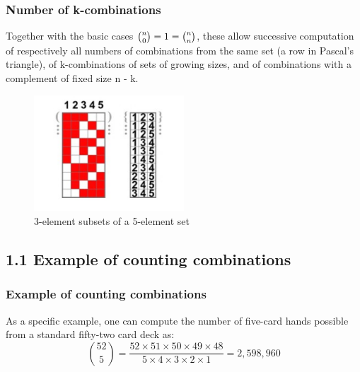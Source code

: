\documentclass{beamer}
\begin{document}
\begin{frame}
\frametitle{Number of k-combinations}
Together with the basic cases ${\tbinom {n}{0}}=1={\tbinom {n}{n}}$, these allow successive computation of respectively all numbers of combinations from the same set (a row in Pascal's triangle), of k-combinations of sets of growing sizes, and of combinations with a complement of fixed size n - k.\\
\begin{figure}[h]
\caption{3-element subsets of a 5-element set}
\centering
\includegraphics[width=0.5\textwidth]{1.pdf}
\end{figure}
\end{frame}

\subsection{1.1 Example of counting combinations}
\begin{frame}
\frametitle{Example of counting combinations}
As a specific example, one can compute the number of five-card hands possible from a standard fifty-two card deck as:
$${\binom {52}{5}}=\frac {52\times 51 \times 50 \times 49 \times 48}{5 \times 4 \times 3 \times 2 \times 1}=2,598,960$$\\
\end{frame}
\end{document}
